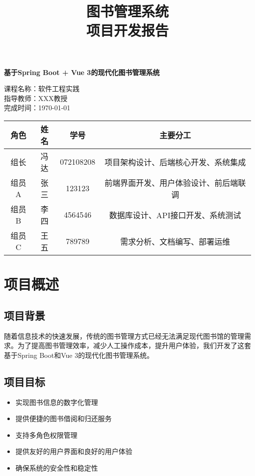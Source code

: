 \documentclass[12pt,a4paper]{article}
\title{\textbf{\Huge 图书管理系统\\项目开发报告}}
\author{}
\date{}
\begin{document}
\maketitle
\thispagestyle{empty}

\vspace{2cm}

\begin{center}
\Large
\textbf{基于Spring Boot + Vue 3的现代化图书管理系统}

\vspace{1cm}

\normalsize
课程名称：软件工程实践\\
指导教师：XXX教授\\
完成时间：\today

\vspace{3cm}

\begin{table}[H]
\centering
\begin{tabular}{|c|c|c|c|}
\hline
\textbf{角色} & \textbf{姓名} & \textbf{学号} & \textbf{主要分工} \\
\hline
组长 & 冯达 & 072108208 & 项目架构设计、后端核心开发、系统集成 \\
\hline
组员A & 张三 & 123123 & 前端界面开发、用户体验设计、前后端联调 \\
\hline
组员B & 李四 & 4564546 & 数据库设计、API接口开发、系统测试 \\
\hline
组员C & 王五 & 789789 & 需求分析、文档编写、部署运维 \\
\hline
\end{tabular}
\end{table}

\end{center}

\newpage
\tableofcontents
\newpage

\section{项目概述}

\subsection{项目背景}
随着信息技术的快速发展，传统的图书管理方式已经无法满足现代图书馆的管理需求。为了提高图书管理效率，减少人工操作成本，提升用户体验，我们开发了这套基于Spring Boot和Vue 3的现代化图书管理系统。

\subsection{项目目标}
\begin{itemize}
    \item 实现图书信息的数字化管理
    \item 提供便捷的图书借阅和归还服务
    \item 支持多角色权限管理
    \item 提供友好的用户界面和良好的用户体验
    \item 确保系统的安全性和稳定性
\end{itemize}
\end{document}
